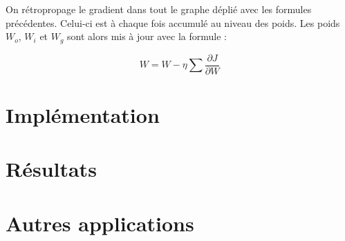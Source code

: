 \documentclass{report}
\theoremstyle{plain}
\theoremstyle{definition}
\theoremstyle{remark}
\begin{document}
On rétropropage le gradient dans tout le graphe déplié avec les formules précédentes. Celui-ci est à chaque fois accumulé au niveau des poids. Les poids $W_{o}$, $W_{i}$ et $W_{g}$ sont alors mis à jour avec la formule :

\begin{equation}
W = W - \eta \sum{\frac{\partial J}{\partial W}}
\end{equation} 

\section{Implémentation}
\section{Résultats}
\section{Autres applications}
\end{document}
